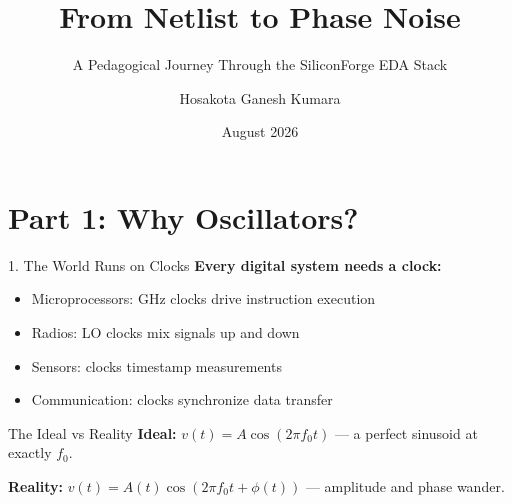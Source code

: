 \documentclass[aspectratio=169, 11pt]{beamer}
\title[SiliconForge]{From Netlist to Phase Noise}
\subtitle{A Pedagogical Journey Through the SiliconForge EDA Stack}
\author{Hosakota Ganesh Kumara}
\date{August 2026}
\begin{document}
\begin{frame}
\titlepage
\end{frame}


\section{Part 1: Why Oscillators?}

\begin{frame}{1. The World Runs on Clocks}
    \textbf{Every digital system needs a clock:}
    \begin{itemize}
        \item Microprocessors: GHz clocks drive instruction execution
        \item Radios: LO clocks mix signals up and down
        \item Sensors: clocks timestamp measurements
        \item Communication: clocks synchronize data transfer
    \end{itemize}

    \vspace{0.5em}
    \begin{block}{The Ideal vs Reality}
        \textbf{Ideal:} $v(t) = A \cos(2\pi f_0 t)$ — a perfect sinusoid at exactly $f_0$.

        \textbf{Reality:} $v(t) = A(t)\cos(2\pi f_0 t + \phi(t))$ — amplitude and phase wander.
    \end{block}
\end{frame}
\end{document}
